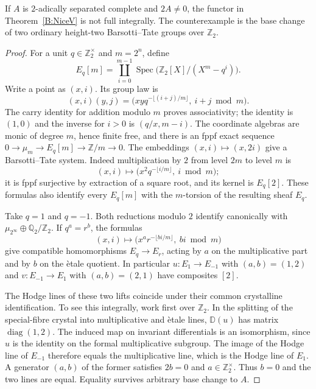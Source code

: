\begin{proposition}
\label{B:Kummer}
If $A$ is $2$-adically separated complete and $2A\ne0$, the functor in
Theorem~\ref{B:NiceV} is not full integrally. The counterexample is the
base change of two ordinary height-two Barsotti--Tate groups over
$\mathbb Z_2$.
\end{proposition}

\begin{proof}
For a unit $q\in\mathbb Z_2^\times$ and $m=2^n$, define
\[
 E_q[m]=\coprod_{i=0}^{m-1}
 \operatorname{Spec}\bigl(\mathbb Z_2[X]/(X^m-q^i)\bigr).
\]
Write a point as $(x,i)$. Its group law is
\[
 (x,i)(y,j)=
 \bigl(xyq^{-\lfloor(i+j)/m\rfloor},\ i+j\bmod m\bigr).
\]
The carry identity for addition modulo $m$ proves associativity;
the identity is $(1,0)$ and the inverse for $i>0$ is $(q/x,m-i)$.
The coordinate algebras are monic of degree $m$, hence finite free,
and there is an fppf exact sequence
$0\to\mu_m\to E_q[m]\to\mathbb Z/m\to0$.
The embeddings $(x,i)\mapsto(x,2i)$ give a Barsotti--Tate system.
Indeed multiplication by $2$ from level $2m$ to level $m$ is
\[
 (x,i)\longmapsto
 \bigl(x^2q^{-\lfloor i/m\rfloor},\ i\bmod m\bigr);
\]
it is fppf surjective by extraction of a square root, and its kernel
is $E_q[2]$. These formulas also identify every $E_q[m]$ with the
$m$-torsion of the resulting sheaf $E_q$.

Take $q=1$ and $q=-1$. Both reductions modulo $2$ identify canonically
with $\mu_{2^\infty}\oplus\mathbb Q_2/\mathbb Z_2$.
If $q^a=r^b$, the formulas
\[
 (x,i)\longmapsto
 \bigl(x^a r^{-\lfloor bi/m\rfloor},\ bi\bmod m\bigr)
\]
give compatible homomorphisms $E_q\to E_r$, acting by $a$ on the
multiplicative part and by $b$ on the \`etale quotient.
In particular $u:E_1\to E_{-1}$ with $(a,b)=(1,2)$ and
$v:E_{-1}\to E_1$ with $(a,b)=(2,1)$ have composites $[2]$.

The Hodge lines of these two lifts coincide under their common
crystalline identification. To see this integrally, work first over
$\mathbb Z_2$. In the splitting of the special-fibre crystal into
multiplicative and \`etale lines, $\mathbb D(u)$ has matrix
$\operatorname{diag}(1,2)$. The induced map on invariant
differentials is an isomorphism, since $u$ is the identity on the
formal multiplicative subgroup. The image of the Hodge line of
$E_{-1}$ therefore equals the multiplicative line, which is the
Hodge line of $E_1$. A generator $(a,b)$ of the former satisfies
$2b=0$ and $a\in\mathbb Z_2^\times$. Thus $b=0$ and the two lines
are equal. Equality survives arbitrary base change to $A$.


\end{proof}
